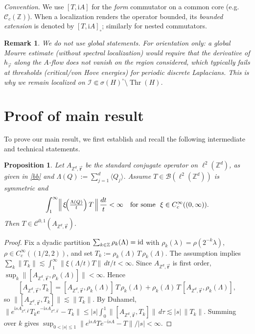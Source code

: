 \documentclass[10pt]{amsart} %
\newcommand{\Z}{{\mathbb{Z}}}
\newcommand{\1}{{\mathbb{I}}}
\newcommand{\Cc}{\mathcal{C}}
\newcommand{\Ic}{\mathcal{I}}
\newcommand{\Thr}{\operatorname{Thr}}
\numberwithin{equation}{section}
\def\id{\mathop{\rm id}\nolimits}
\newtheorem{proposition}[theorem]{Proposition}%
\newtheorem{remark}[theorem]{Remark}%
\begin{document}
\noindent\textit{Convention.}
We use $[T,\mathrm{i}A]$ for the \emph{form} commutator on a common core (e.g.\ $\Cc_c(\Z)$).
When a localization renders the operator bounded, its \emph{bounded extension} is denoted by
$[T,\mathrm{i}A]_{\circ}$; similarly for nested commutators.


\begin{remark}
We do not use global statements. For orientation only: a \emph{global} Mourre estimate (without spectral localization)
would require that the derivative of \(h_{\vec r}\) along the \(A\)-flow does not vanish on the region considered,
which typically fails at thresholds (critical/von Hove energies) for periodic discrete Laplacians.
This is why we remain \emph{localized} on \(\Ic\Subset\sigma(H)^\circ\setminus\Thr(H)\).
\end{remark}
\section{Proof of main result}
To prove our main result, we first establish and recall the following intermediate and technical statements.


\begin{proposition}
\label{prop:C01-functional}
Let $A_{\mathbb{Z}^d,\vec{\mathbf{r}}}$ be the standard conjugate operator on $\ell^2(\mathbb{Z}^d)$, as given in \eqref{bb} and
$\Lambda(Q):=\sum_{j=1}^d \langle Q_j\rangle$.
Assume $T\in\mathcal{B}(\ell^2(\mathbb{Z}^d))$ is symmetric and
\[
\int_{1}^{\infty}\Bigl\|\,\xi\!\Bigl(\tfrac{\Lambda(Q)}{t}\Bigr)\,T\,\Bigr\|\,\frac{dt}{t}<\infty
\quad\text{for some }\ \xi\in C_c^\infty((0,\infty)).
\]
Then $T\in \mathcal{C}^{0,1}(A_{\mathbb{Z}^d,\vec{\mathbf{r}}})$.
\end{proposition}

\begin{proof}
Fix a dyadic partition $\sum_{k\in\mathbb{Z}}\rho_k(\Lambda)=\id$ with $\rho_k(\lambda)=\rho(2^{-k}\lambda)$, $\rho\in C_c^\infty((1/2,2))$, and set $T_k:=\rho_k(\Lambda)\,T\,\rho_k(\Lambda)$. The assumption implies $\sum_k\|T_k\|\lesssim\int_1^\infty\|\xi(\Lambda/t)T\|\,dt/t<\infty$. Since $A_{\mathbb{Z}^d,\vec{\mathbf{r}}}$ is first order, $\sup_k\|[A_{\mathbb{Z}^d,\vec{\mathbf{r}}},\rho_k(\Lambda)]\|<\infty$. Hence
\[
[A_{\mathbb{Z}^d,\vec{\mathbf{r}}},T_k]=[A_{\mathbb{Z}^d,\vec{\mathbf{r}}},\rho_k(\Lambda)]\,T\,\rho_k(\Lambda)+\rho_k(\Lambda)\,T\,[A_{\mathbb{Z}^d,\vec{\mathbf{r}}},\rho_k(\Lambda)],
\]
so $\|[A_{\mathbb{Z}^d,\vec{\mathbf{r}}},T_k]\|\lesssim\|T_k\|$. By Duhamel,
\(
\|e^{\mathrm i sA_{\mathbb{Z}^d,\vec{\mathbf{r}}}}T_ke^{-\mathrm i sA_{\mathbb{Z}^d,\vec{\mathbf{r}}}}-T_k\|\le |s|\int_0^1\|[A_{\mathbb{Z}^d,\vec{\mathbf{r}}},T_k]\|\,d\tau\lesssim |s|\,\|T_k\|.
\)
Summing over $k$ gives $\sup_{0<|s|\le1}\|e^{\mathrm i sA}Te^{-\mathrm i sA}-T\|/|s|<\infty$.
\end{proof}
\end{document}
